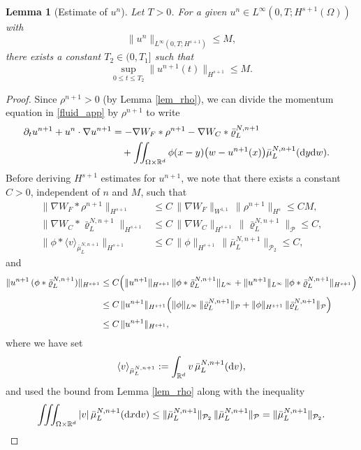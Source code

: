 \documentclass[10pt, reqno]{amsart}
\newtheorem{lemma}[theorem]{Lemma}
\theoremstyle{definition}
\theoremstyle{remark}
\numberwithin{equation}{section}
\newcommand{\dx}{\textnormal{d}x}
\newcommand{\dy}{\textnormal{d}y}
\newcommand{\dv}{\textnormal{d}v}
\newcommand{\dw}{\textnormal{d}w}
\begin{document}
\begin{lemma}[Estimate of $u^n$]\label{lem_u}
Let $T>0$. For a given $u^n \in L^\infty(0,T; H^{s+1}(\Omega))$ with
\[
\|u^n\|_{L^\infty(0,T; H^{s+1})} \le M,
\]
there exists a constant $T_2 \in (0,T_1]$ such that
\[
\sup_{0\le t\le T_2} \|u^{n+1}(t)\|_{H^{s+1}} \le M.
\]
\end{lemma}
\begin{proof}
Since $\rho^{n+1}>0$ (by Lemma \ref{lem_rho}), we can divide the momentum equation in \eqref{fluid_app} by $\rho^{n+1}$ to write
\begin{align}\label{u_eq}
\begin{aligned}
 \partial_t u^{n+1} + u^n\cdot \nabla u^{n+1}  
&  = - \nabla W_F * \rho^{n+1} - \nabla W_C * \bar\varrho_L^{N, n+1} \cr
&\quad + \iint_{\Omega \times\mathbb{R}^d} \phi(x-y) \bigl(w-u^{n+1}(x)\bigr) \bar\mu_L^{N, n+1}(\dy\dw).
\end{aligned}
\end{align}
Before deriving $H^{s+1}$ estimates for $u^{n+1}$, we note that there exists a constant $C>0$, independent of $n$ and $M$, such that
\begin{align*}
\|\nabla W_F * \rho^{n+1}\|_{H^{s+1}} &\le C\, \|\nabla W_F\|_{W^{1,1}}\, \|\rho^{n+1}\|_{H^s} \le C M,\\[1mm]
\|\nabla W_C *  \bar\varrho_L^{N, n+1}\|_{H^{s+1}} &\le C\, \|\nabla W_C\|_{H^{s+1}}\, \| \bar\varrho_L^{N, n+1}\|_{\mathcal{P}} \le C,\\[1mm]
\|\phi *  \langle v \rangle_{\bar\mu^{N, n+1}_L}\|_{H^{s+1}} &\le C\, \|\phi\|_{H^{s+1}}\, \|\bar\mu_L^{N, n+1}\|_{\mathcal{P}_2} \le C,
\end{align*}
and
\begin{align*}
 \| u^{n+1}\, (\phi *  \bar\varrho^{N, n+1}_L)\|_{H^{s+1}}  
&  \le C\Bigl(\|u^{n+1}\|_{H^{s+1}}\, \|\phi * \bar\varrho^{N, n+1}_L\|_{L^\infty} + \|u^{n+1}\|_{L^\infty}\, \|\phi *  \bar\varrho^{N, n+1}_L\|_{H^{s+1}}\Bigr)\\[1mm] 
&  \le C\, \|u^{n+1}\|_{H^{s+1}}\Bigl(\|\phi\|_{L^\infty}\, \|\bar\varrho_L^{N, n+1}\|_{\mathcal{P}} + \|\phi\|_{H^{s+1}}\, \|\bar\varrho_L^{N, n+1}\|_{\mathcal{P}}\Bigr)\\[1mm]
&  \le C\, \|u^{n+1}\|_{H^{s+1}},
\end{align*}
where we have set
\[
\langle v \rangle_{\bar\mu^{N, n+1}_L} := \int_{\mathbb{R}^d} v\, \bar\mu^{N, n+1}_L(\dv),
\]
and used the bound from Lemma \ref{lem_rho} along with the inequality
\[
\iiint_{\Omega\times\mathbb{R}^d} |v|\, \bar\mu^{N, n+1}_L(\dx\dv) \le \|\bar\mu^{N, n+1}_L\|_{\mathcal{P}_2}\,\|\bar\mu^{N, n+1}_L\|_{\mathcal{P}} = \|\bar\mu^{N, n+1}_L\|_{\mathcal{P}_2}.
\]


\end{proof}
\end{document}

